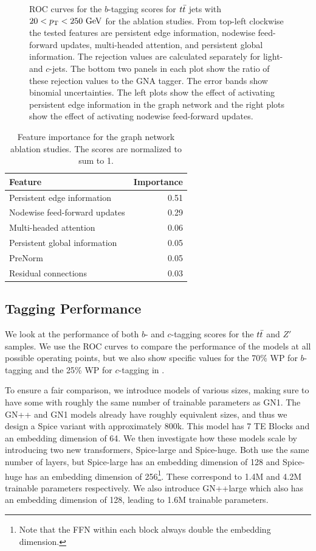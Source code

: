 \begin{figure}[ht]
    \caption{ROC curves for the $b$-tagging scores for $t\bar{t}$ jets with $20 < \pt < 250~\GeV$ for the ablation studies.
    From top-left clockwise the tested features are persistent edge information, nodewise feed-forward updates, multi-headed attention, and persistent global information. The rejection values are calculated separately for light- and $c$-jets. The bottom two panels in each plot show the ratio of these rejection values to the GNA tagger. The error bands show binomial uncertainties. The left plots show the effect of activating persistent edge information in the graph network and the right plots show the effect of activating nodewise feed-forward updates.}
    \label{fig:ablation}
\end{figure}

\begin{table}
    \centering
    \begin{tabular}{lr}
        \toprule
        Feature & Importance \\
        \midrule
        Persistent edge information & 0.51 \\
        Nodewise feed-forward updates & 0.29 \\
        Multi-headed attention & 0.06 \\
        Persistent global information & 0.05 \\
        PreNorm & 0.05 \\
        Residual connections & 0.03 \\
        \bottomrule
    \end{tabular}
    \caption{Feature importance for the graph network ablation studies. The scores are normalized to sum to 1.}
    \label{tab:feature_importance}
\end{table}

\subsection{Tagging Performance}

We look at the performance of both $b$- and $c$-tagging scores for the $t\bar{t}$ and $Z'$ samples.
We use the ROC curves to compare the performance of the models at all possible operating points, but we also show specific values for the 70\% WP for $b$-tagging and the 25\% WP for $c$-tagging in .


To ensure a fair comparison, we introduce models of various sizes, making sure to have some with roughly the same number of trainable parameters as GN1.
The GN++ and GN1 models already have roughly equivalent sizes, and thus we design a Spice variant with approximately 800k.
This model has 7 TE Blocks and an embedding dimension of 64.
We then investigate how these models scale by introducing two new transformers, Spice-large and Spice-huge.
Both use the same number of layers, but Spice-large has an embedding dimension of 128 and Spice-huge has an embedding dimension of 256\footnote{Note that the FFN within each block always double the embedding dimension.}.
These correspond to 1.4M and 4.2M trainable parameters respectively.
We also introduce GN++large which also has an embedding dimension of 128, leading to 1.6M trainable parameters.

